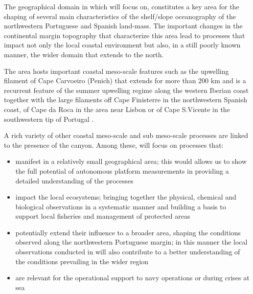 The geographical domain in which \proj will focus on, constitutes a
key area for the shaping of several main characteristics of the
shelf/slope oceanography of the northwestern Portuguese and Spanish
land-mass.  The important changes in the continental margin topography
that characterize this area lead to processes that impact not only the
local coastal environment but also, in a still poorly known manner,
the wider domain that extends to the north.


The area hosts important coastal meso-scale features such as the
upwelling filament of Cape Carvoeiro (Penich) that extends for more
than 200 km and is a recurrent feature of the summer upwelling regime
along the western Iberian coast together with the large filaments off
Cape Finisterre in the northwestern Spanish coast, of Cape da Roca in
the area near Lisbon or of Cape S.Vicente in the southwestern tip of
Portugal \cite{haynes93}.

A rich variety of other coastal meso-scale and sub meso-scale
processes are linked to the presence of the \naz canyon. Among these,
\proj will focus on processes that:

\begin{itemize}[noitemsep,topsep=0pt,parsep=0pt,partopsep=0pt]

\item manifest in a relatively small geographical area; this would
  allows us to show the full potential of autonomous platform
  measurements in providing a detailed understanding of the processes

\item impact the local ecosystems; bringing together the physical,
  chemical and biological observations in a systematic manner and
  building a basis to support local fisheries and management of
  protected areas

\item potentially extend their influence to a broader area, shaping
  the conditions observed along the northwestern Portuguese margin; in
  this manner the local observations conducted in \proj will also
  contribute to a better understanding of the conditions prevailing in
  the wider region

\item are relevant for the operational support to navy operations or
  during crises at sea

\end{itemize}  

